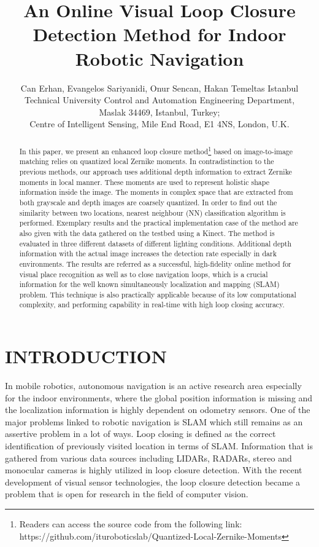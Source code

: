\documentclass[]{spie}  %
\title{An Online Visual Loop Closure Detection Method for Indoor Robotic Navigation}
\author{
Can Erhan\supit{a}, 
Evangelos Sariyanidi\supit{b}, 
Onur Sencan\supit{a}, 
Hakan Temeltas\supit{a}
\skiplinehalf
\supit{a}Istanbul Technical University Control and Automation Engineering Department, \\
Maslak 34469, Istanbul, Turkey; \\
\supit{b}Centre of Intelligent Sensing, Mile End Road, E1 4NS, London, U.K.
}
\begin{document}
 
\maketitle 

\begin{abstract}
In this paper, we present an enhanced loop closure method\footnote{Readers can access the source code from the following link: \\https://github.com/ituroboticslab/Quantized-Local-Zernike-Moments} based on image-to-image matching  relies on quantized local Zernike moments. In contradistinction to the previous methods, our approach uses additional depth information to extract Zernike moments in local manner. These moments are used to represent holistic shape information inside the image. The moments in complex space that are extracted from both grayscale and depth images are coarsely quantized. In order to find out the similarity between two locations, nearest neighbour (NN) classification algorithm is performed. Exemplary results and the practical implementation case of the method are also given with the data gathered on the testbed using a Kinect. The method is evaluated in three different datasets of different lighting conditions. Additional depth information with the actual image increases the detection rate especially in dark environments. The results are referred as a successful, high-fidelity online method for visual place recognition as well as to close navigation loops, which is a crucial information for the well known simultaneously localization and mapping (SLAM) problem. This technique is also practically applicable because of its low computational complexity, and performing capability in real-time with high loop closing accuracy.

\end{abstract}



\section{INTRODUCTION}

In mobile robotics, autonomous navigation is an active research area especially for the indoor environments, where the global position information is missing and the localization information is highly dependent on odometry sensors. One of the major problems linked to robotic navigation is SLAM which still remains as an assertive problem in a lot of ways. Loop closing is defined as the correct identification of previously visited location in terms of SLAM. Information that is gathered from various data sources including LIDARs, RADARs, stereo and monocular cameras\cite{williams08iros, 5650234} is highly utilized in loop closure detection. With the recent development of visual sensor technologies, the loop closure detection became a problem that is open for research in the field of computer vision.
\end{document}
